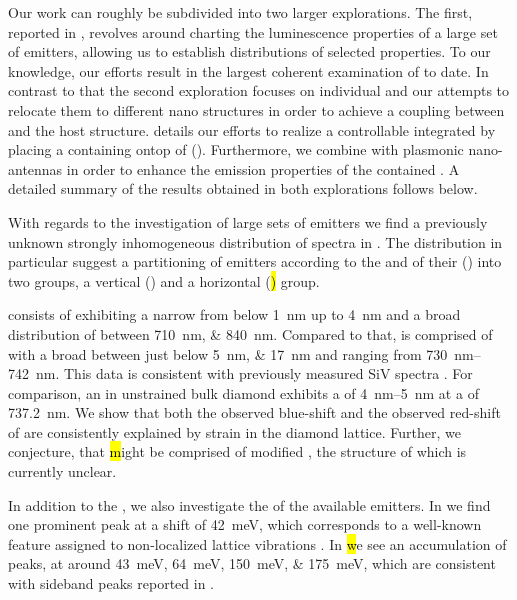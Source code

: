    Our work can roughly be subdivided into two larger explorations. The first, reported in , revolves around charting the luminescence properties of a large set of emitters, allowing us to establish distributions of selected \siv properties. To our knowledge, our efforts result in the largest coherent examination of \sivs to date. In contrast to that the second exploration focuses on individual \nds and our attempts to relocate them to different nano structures in order to achieve a coupling between \sivs and the host structure.  details our efforts to realize a controllable integrated \sps by placing a \nd containing \sivs ontop of \vcsel (\VCSEL). Furthermore, we combine \nds with plasmonic nano-antennas in order to enhance the emission properties of the contained \sivs. A detailed summary of the results obtained in both explorations follows below.


   With regards to the investigation of large sets of emitters we find a previously unknown strongly inhomogeneous distribution of \siv spectra in \nds. The distribution in particular suggest a partitioning of emitters according to the \wl and \lw of their \zpls (\ZPL) into two groups, a vertical (\vl) and a horizontal (\hl) group.

   \Hl consists of \ZPLs exhibiting a narrow \lw from below \SI{1}{nm} up to \SI{4}{nm} and a broad distribution of \cwl between \SIlist{710;840}{nm}.
   Compared to that, \vl is comprised of \ZPLs with a broad \lw between just below \SIlist{5; 17}{nm} and \cwl ranging from \SIrange{730}{742}{nm}.
   This data is consistent with previously measured SiV spectra \cite{Benedikter2017a,Neu2012}.
   For comparison, an \siv in unstrained bulk diamond exhibits a \lw of \SIrange{4}{5}{nm} at a \cwl of \SI{737.2}{nm}\cite{Arend2016a,Dietrich2014}.
   We show that both the observed blue-shift and the observed red-shift of \vl are consistently explained by strain in the diamond lattice.
   Further, we conjecture, that \hl might be comprised of modified \sivs, the structure of which is currently unclear.

   In addition to the \zpl, we also investigate the \psb of the available emitters. In \vl we find one prominent peak at a shift of \SI{42}{meV}, which corresponds to a well-known feature assigned to non-localized lattice vibrations \cite{Larkins1971,Sternschulte1994}.
   In \hl we see an accumulation of peaks, at around \SIlist{43;64;150;175}{meV}, which are consistent with sideband peaks reported in \cite{Sternschulte1994,Zaitsev2001,Neu2011}.


